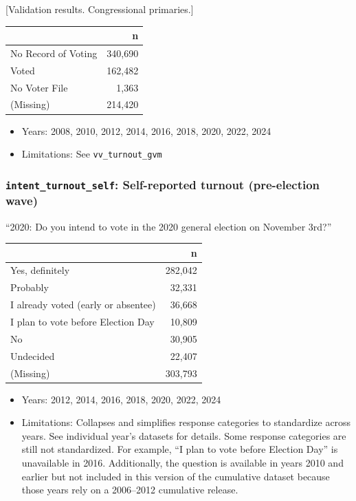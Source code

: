 \documentclass[10pt,article,oneside]{memoir}
\begin{document}
{[}Validation results. Congressional primaries.{]}

\begin{table}[H]
\centering
\begin{tabular}[t]{lr}
\toprule
 & n\\
\midrule
No Record of Voting & 340,690\\
Voted & 162,482\\
No Voter File & 1,363\\
(Missing) & 214,420\\
\bottomrule
\end{tabular}
\end{table}

\begin{itemize}
\tightlist
\item
  Years: 2008, 2010, 2012, 2014, 2016, 2018, 2020, 2022, 2024
\item
  Limitations: See \texttt{vv\_turnout\_gvm}
\end{itemize}

\subsubsection{\texorpdfstring{\texttt{intent\_turnout\_self}:
Self-reported turnout (pre-election
wave)}{intent\_turnout\_self: Self-reported turnout (pre-election wave)}}\label{intent_turnout_self-self-reported-turnout-pre-election-wave}

``2020: Do you intend to vote in the 2020 general election on November
3rd?''

\begin{table}[H]
\centering
\begin{tabular}[t]{lr}
\toprule
 & n\\
\midrule
Yes, definitely & 282,042\\
Probably & 32,331\\
I already voted (early or absentee) & 36,668\\
I plan to vote before Election Day & 10,809\\
No & 30,905\\
Undecided & 22,407\\
(Missing) & 303,793\\
\bottomrule
\end{tabular}
\end{table}

\begin{itemize}
\tightlist
\item
  Years: 2012, 2014, 2016, 2018, 2020, 2022, 2024
\item
  Limitations: Collapses and simplifies response categories to
  standardize across years. See individual year's datasets for details.
  Some response categories are still not standardized. For example, ``I
  plan to vote before Election Day'' is unavailable in 2016.
  Additionally, the question is available in years 2010 and earlier but
  not included in this version of the cumulative dataset because those
  years rely on a 2006--2012 cumulative release.
\end{itemize}
\end{document}
